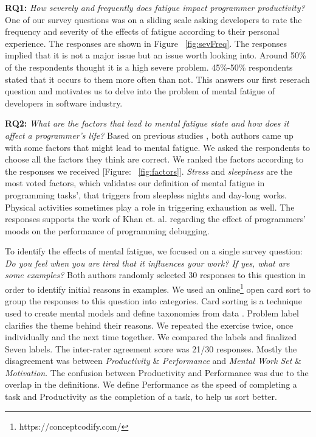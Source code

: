 \documentclass{acm_proc_article-sp}
\begin{document}
\textbf{RQ1:} \textit{How severely and frequently does fatigue impact
programmer productivity?} One of our survey questions was on a sliding scale
asking developers to rate the frequency and severity of the effects of fatigue
according to their personal experience. The responses are shown in Figure
~\ref{fig:sevFreq}. The responses implied that it is not a major issue but an
issue worth looking into. Around 50\% of the respondents thought it is a high
severe problem. 45\%-50\% respondents stated that it occurs to them more often
than not. This answers our first reserach question and motivates us to delve
into the problem of mental fatigue of developers in software industry.

\textbf{RQ2:} \textit{What are the factors that lead to mental fatigue state and
how does it affect a programmer's life?} Based on previous studies
\cite{saito:industry}, both authors came up with some factors that might lead to
mental fatigue. We asked the respondents to choose all the factors they think
are correct. We ranked the factors according to the responses we received
[Figure: ~\ref{fig:factors}]. \textit{Stress} and \textit{sleepiness} are the
most voted factors, which validates our definition of mental fatigue in
programming tasks', that triggers from sleepless nights and day-long works.
Physical activities sometimes play a role in triggering exhaustion as well. The
responses supports the work of Khan et. al. \cite{khan:mood} regarding the
effect of programmers' moods on the performance of programming debugging.

To identify the effects of mental fatigue, we focused on a single survey
question:
\textit{Do you feel when you are tired that it influences your work? If yes,
what are some examples?}
Both authors randomly selected 30 responses to this question in order to
identify initial reasons in examples. We used an
online\footnote{https://conceptcodify.com/} open card sort to group the
responses to this question into categories. Card sorting is a technique used to
create mental  models and define taxonomies from data \cite{begel:cards}.
Problem label clarifies the theme behind their reasons. We repeated the exercise
twice, once individually and the next time together. We compared the labels and
finalized Seven labels. The inter-rater agreement score was 21/30 responses.
Mostly the disagreement was between \textit{Productivity} \& \textit{Performance} and
\textit{Mental Work Set} \& \textit{Motivation}. The confusion between
Productivity and Performance was due to the overlap in the definitions. We
define Performance as the speed of completing a task and Productivity as the
completion of a task, to help us sort better.
\end{document}
